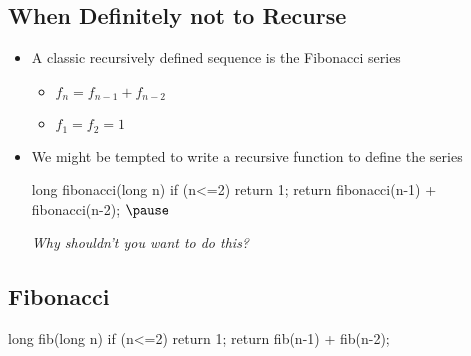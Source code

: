 \begin{slide}
\section[-1]{When Definitely not to Recurse}

\begin{PauseHighLight}
\begin{itemize}
\item A classic recursively defined sequence is the Fibonacci series
  \begin{itemize}
  \item $f_n = f_{n-1} + f_{n-2}$
  \item $f_1 = f_2 = 1$\pause
  \end{itemize}
\item We might be tempted to write a recursive function to define the
  series
  \begin{java}
    long fibonacci(long n)
    {
      if (n<=2)
         return 1;
      return fibonacci(n-1) + fibonacci(n-2);
    }$\pause$
  \end{java}
  \emph{Why shouldn't you want to do this?}\pause
\end{itemize}
\end{PauseHighLight}
\end{slide}


\begin{slide}
\section[-1]{Fibonacci}

\pb
\begin{java}
  long fib(long n)
  {
    if (n<=2)
      return 1;
    return fib(n-1) + fib(n-2);
  }
\end{java}\pause

\begin{center}
  \pause
\end{center}

\end{slide}



